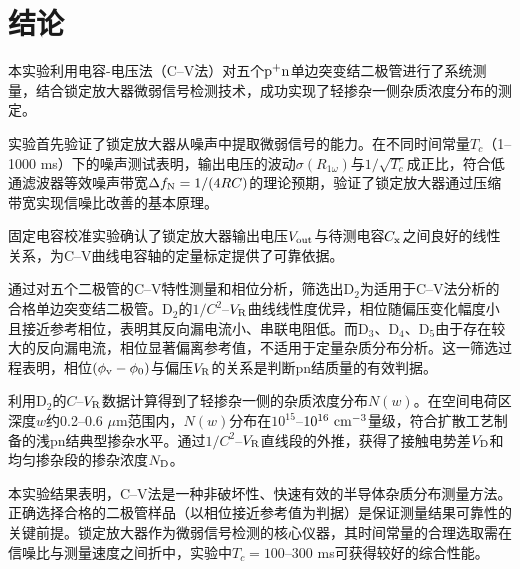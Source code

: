 \section{结论}

本实验利用电容-电压法（C--V法）对五个${\rm p}^+{\rm n}$单边突变结二极管进行了系统测量，结合锁定放大器微弱信号检测技术，成功实现了轻掺杂一侧杂质浓度分布的测定。

实验首先验证了锁定放大器从噪声中提取微弱信号的能力。在不同时间常量$T_c$（1--1000 ms）下的噪声测试表明，输出电压的波动$\sigma(R_{1\omega})$与$1/\sqrt{T_c}$成正比，符合低通滤波器等效噪声带宽$\Delta f_{\rm N}=1/(4RC)$的理论预期，验证了锁定放大器通过压缩带宽实现信噪比改善的基本原理。

固定电容校准实验确认了锁定放大器输出电压$V_{\rm out}$与待测电容$C_{\rm x}$之间良好的线性关系，为C--V曲线电容轴的定量标定提供了可靠依据。

通过对五个二极管的C--V特性测量和相位分析，筛选出D$_2$为适用于C--V法分析的合格单边突变结二极管。D$_2$的$1/C^{2}$--$V_{\rm R}$曲线线性度优异，相位随偏压变化幅度小且接近参考相位，表明其反向漏电流小、串联电阻低。而D$_3$、D$_4$、D$_5$由于存在较大的反向漏电流，相位显著偏离参考值，不适用于定量杂质分布分析。这一筛选过程表明，相位$(\phi_{\rm v}-\phi_0)$与偏压$V_{\rm R}$的关系是判断pn结质量的有效判据。

利用D$_2$的$C$--$V_{\rm R}$数据计算得到了轻掺杂一侧的杂质浓度分布$N(w)$。在空间电荷区深度$w$约0.2--0.6 $\mu$m范围内，$N(w)$分布在$10^{15}$--$10^{16}\ {\rm cm}^{-3}$量级，符合扩散工艺制备的浅pn结典型掺杂水平。通过$1/C^{2}$--$V_{\rm R}$直线段的外推，获得了接触电势差$V_{\rm D}$和均匀掺杂段的掺杂浓度$N_{\rm D}$。

本实验结果表明，C--V法是一种非破坏性、快速有效的半导体杂质分布测量方法。正确选择合格的二极管样品（以相位接近参考值为判据）是保证测量结果可靠性的关键前提。锁定放大器作为微弱信号检测的核心仪器，其时间常量的合理选取需在信噪比与测量速度之间折中，实验中$T_c = 100$--300 ms可获得较好的综合性能。
